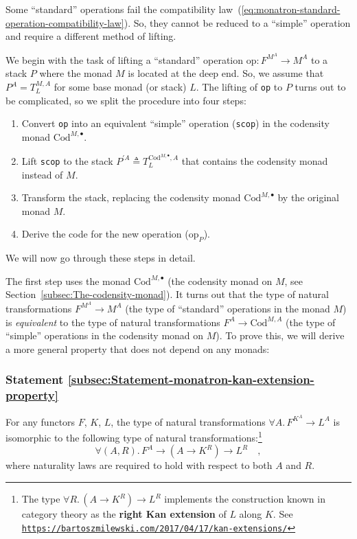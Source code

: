 Some \textsf{``}standard\textsf{''} operations fail the compatibility law~(\ref{eq:monatron-standard-operation-compatibility-law}).
So, they cannot be reduced to a \textsf{``}simple\textsf{''} operation and require
a different method of lifting.

We begin with the task of lifting a \textsf{``}standard\textsf{''} operation $\text{op}:F^{M^{A}}\rightarrow M^{A}$
to a stack $P$ where the monad $M$ is located at the deep end. So,
we assume that $P^{A}=T_{L}^{M,A}$ for some base monad (or stack)
$L$. The lifting of \lstinline!op! to $P$ turns out to be complicated,
so we split the procedure into four steps:
\begin{enumerate}
\item Convert \lstinline!op! into an equivalent \textsf{``}simple\textsf{''} operation
(\lstinline!scop!) in the codensity monad $\text{Cod}^{M,\bullet}$.
\item Lift \lstinline!scop! to the stack $P^{\prime A}\triangleq T_{L}^{\text{Cod}^{M,\bullet},A}$
that contains the codensity monad instead of $M$.
\item Transform the stack, replacing the codensity monad $\text{Cod}^{M,\bullet}$
by the original monad $M$.
\item Derive the code for the new operation ($\text{op}_{P}$).
\end{enumerate}
We will now go through these steps in detail.

The first step uses the monad $\text{Cod}^{M,\bullet}$ (the codensity
monad on $M$, see Section~\ref{subsec:The-codensity-monad}). It
turns out that the type of natural transformations $F^{M^{A}}\rightarrow M^{A}$
(the type of \textsf{``}standard\textsf{''} operations in the monad $M$) is \emph{equivalent}
to the type of natural transformations $F^{A}\rightarrow\text{Cod}^{M,A}$
(the type of \textsf{``}simple\textsf{''} operations in the codensity monad on $M$).
To prove this, we will derive a more general property that does not
depend on any monads:

\subsubsection{Statement \label{subsec:Statement-monatron-kan-extension-property}\ref{subsec:Statement-monatron-kan-extension-property}}

For any functors $F$, $K$, $L$, the type of natural transformations
$\forall A.\,F^{K^{A}}\rightarrow L^{A}$ is isomorphic to the following
type of natural transformations:\footnote{The type $\forall R.\,(A\rightarrow K^{R})\rightarrow L^{R}$ implements
the construction known in category theory as the \textbf{right Kan
extension} of $L$ along $K$. See \texttt{\href{https://bartoszmilewski.com/2017/04/17/kan-extensions/}{https://bartoszmilewski.com/2017/04/17/kan-extensions/}}}
\[
\forall(A,R).\,F^{A}\rightarrow(A\rightarrow K^{R})\rightarrow L^{R}\quad,
\]
where naturality laws are required to hold with respect to both $A$
and $R$.

